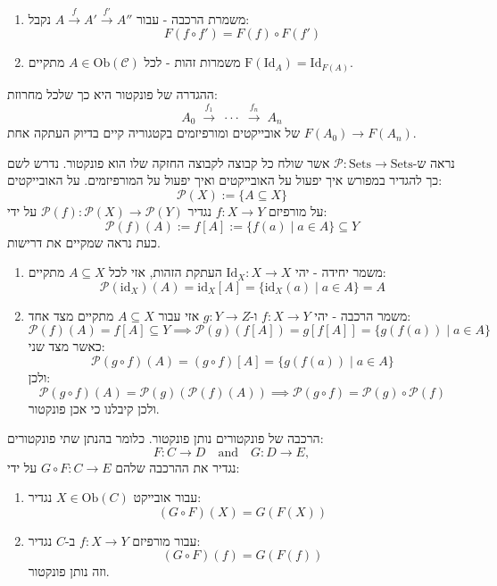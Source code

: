 \documentclass{tstextbook}
\begin{document}
\begin{enumerate}
  \item משמרת הרכבה - עבור \(A\xrightarrow{f}A'\xrightarrow{f'}A''\) נקבל: 
$$F(f\circ f')=F(f)\circ F(f')$$


  \item משמרות זהות - לכל \(A \in \mathrm{Ob}(\mathcal{C})\) מתקיים \(\mathrm{F}(\mathrm{Id}_{A})=\mathrm{Id}_{F(A)}\). 


\end{enumerate}
\begin{remark}
ההגדרה של פונקטור היא כך שלכל מחרוזת:
$$A_{0}\;{\xrightarrow{\ f_{1}\ }}\;\cdot\cdot\cdot\;{\xrightarrow{\ f_{n}\ }}\;A_{n}$$
של אובייקטים ומורפיזמים בקטגוריה קיים בדיוק העתקה אחת \(F(A_{0})\to F(A_{n})\).

\end{remark}
\begin{example}
נראה ש-\(\mathcal{P}:\mathrm{Sets}\to \mathrm{Sets}\) אשר שולח כל קבוצה לקבוצה החזקה שלו הוא פונקטור. נדרש לשם כך להגדיר במפורש איך יפעול על האובייקטים ואיך יפעול על המורפיזמים. על האובייקטים:
$${\mathcal{P}}(X):=\{A\subseteq X\}$$
על מורפיזם \(f:X\to Y\) נגדיר \({\mathcal{P}}(f):{\mathcal{P}}(X)\to{\mathcal{P}}(Y)\) על ידי:
$${\mathcal{P}}(f)(A):=f[A]:=\{f(a)\mid a\in A\}\subseteq Y$$
כעת נראה שמקיים את דרישות.

  \begin{enumerate}
    \item משמר יחידה - יהי \(\mathrm{Id}_{X}:X\to X\) העתקת הזהות, אזי לכל \(A\subseteq X\) מתקיים: 
$${\mathcal{P}}({\mathrm{id}}_{X})(A)={\mathrm{id}}_{X}[A]=\{{\mathrm{id}}_{X}(a)\mid a\in A\}=A$$


    \item משמר הרכבה - יהי \(f:X\to Y\) ו-\(g:Y\to Z\) אזי עבור \(A\subseteq X\) מתקיים מצד אחד: 
$${\mathcal{P}}(f)(A)=f[A]\subseteq Y\implies {\mathcal{P}}(g)(f[A])=g[f[A]]=\{g(f(a))\mid a\in A\}$$
כאשר מצד שני:
$${\mathcal{P}}(g\circ f)(A)=(g\circ f)[A]=\{g(f(a))\mid a\in A\}$$
ולכן:
$${\mathcal{P}}\left( g\circ f \right)(A)={\mathcal{P}}(g)\left( {\mathcal{P}}(f)(A) \right)\implies {\mathcal{P}}(g\circ f)={\mathcal{P}}(g)\circ{\mathcal{P}}(f)$$
ולכן קיבלנו כי אכן פונקטור.


  \end{enumerate}
\end{example}
\begin{proposition}
הרכבה של פונקטורים נותן פונקטור. כלומר בהנתן שתי פונקטורים:
$$F:C\to D\quad{\mathrm{and}}\quad G:D\to E,$$
נגדיר את ההרכבה שלהם \(G\circ F:C\to E\) על ידי:

  \begin{enumerate}
    \item עבור אובייקט \(X \in \mathrm{Ob}(C)\) נגדיר: 
$$(G\circ F)(X)=G(F(X))$$


    \item עבור מורפיזם \(f:X\to Y\) ב-\(C\) נגדיר: 
$$(G\circ F)(f)=G(F(f))$$
וזה נותן פונקטור.


  \end{enumerate}
\end{proposition}
\end{document}

